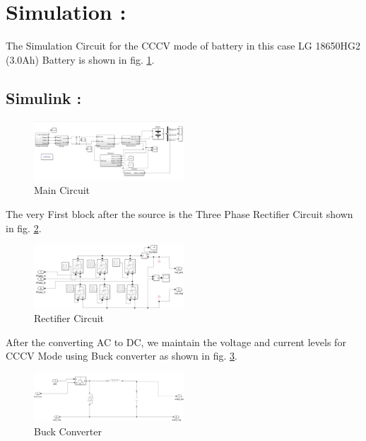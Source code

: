 \documentclass[conference]{IEEEtran}
\begin{document}
\section{Simulation :}
\hspace{0.5cm}The Simulation Circuit for the CCCV mode of battery in this case LG 18650HG2 (3.0Ah) Battery is shown in fig. \ref{Main_Simulink_Circuit}.
\subsection{Simulink :}
\begin{figure}[htbp]
    \centering
    \includegraphics[width=0.5\textwidth]{images/main_simu.jpeg}
    \caption{Main Circuit}
    \label{Main_Simulink_Circuit}
\end{figure}

The very First block after the source is the Three Phase Rectifier Circuit shown in fig. \ref{rectifier_circuit}.
\begin{figure}[htbp]
    \centering
    \includegraphics[width=0.5\textwidth]{images/three_phase_rectifier.jpeg}
    \caption{Rectifier Circuit}
    \label{rectifier_circuit}
\end{figure}

After the converting AC to DC, we maintain the voltage and current levels for CCCV Mode using Buck converter as shown in fig. \ref{buck_converter}.
\begin{figure}[htbp]
    \centering
    \includegraphics[width=0.5\textwidth]{images/buck_converter.jpeg}
    \caption{Buck Converter}
    \label{buck_converter}
\end{figure}
\end{document}
